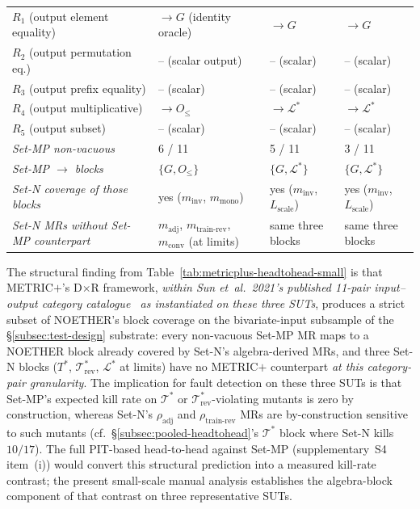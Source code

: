 \documentclass[acmsmall, screen]{acmart}
\begin{document}
\begin{table}[h]
\begin{tabular}{l l l l}
$R_1$ (output element equality)& $\to G$ (identity oracle) & $\to G$ & $\to G$ \\
$R_2$ (output permutation eq.) & -- (scalar output) & -- (scalar) & -- (scalar) \\
$R_3$ (output prefix equality) & -- (scalar) & -- (scalar) & -- (scalar) \\
$R_4$ (output multiplicative)  & $\to O_{\le}$ & $\to \mathcal{L}^{*}$ & $\to \mathcal{L}^{*}$ \\
$R_5$ (output subset)          & -- (scalar) & -- (scalar) & -- (scalar) \\
\midrule
\textit{Set-MP non-vacuous} & 6 / 11 & 5 / 11 & 3 / 11 \\
\textit{Set-MP $\to$ blocks} & $\{G, O_{\le}\}$ & $\{G, \mathcal{L}^{*}\}$ & $\{G, \mathcal{L}^{*}\}$ \\
\textit{Set-N coverage of those blocks} & yes ($m_{\mathrm{inv}}$, $m_{\mathrm{mono}}$) & yes ($m_{\mathrm{inv}}$, $L_{\mathrm{scale}}$) & yes ($m_{\mathrm{inv}}$, $L_{\mathrm{scale}}$) \\
\textit{Set-N MRs without Set-MP counterpart} & $m_{\mathrm{adj}}$, $m_{\mathrm{train\text{-}rev}}$, $m_{\mathrm{conv}}$ (at limits) & same three blocks & same three blocks \\
\bottomrule
\end{tabular}
\end{table}

The structural finding from Table~\ref{tab:metricplus-headtohead-small} is
that METRIC$+$'s D$\times$R framework, \emph{within Sun et~al.\ 2021's
published 11-pair input--output category catalogue~\cite{SunMETRICplus2021}
as instantiated on these three SUTs}, produces a strict subset of NOETHER's
block coverage on the bivariate-input subsample of the \S\ref{subsec:test-design}
substrate: every non-vacuous Set-MP MR maps to a NOETHER block already
covered by Set-N's algebra-derived MRs, and three Set-N blocks
($T^{*}$, $\mathcal{T}^{*}_{\mathrm{rev}}$, $\mathcal{L}^{*}$ at limits)
have no METRIC$+$ counterpart \emph{at this category-pair granularity}. The implication for fault detection on
these three SUTs is that Set-MP's expected kill rate on $\mathcal{T}^{*}$
or $\mathcal{T}^{*}_{\mathrm{rev}}$-violating mutants is zero by
construction, whereas Set-N's $\rho_{\mathrm{adj}}$ and
$\rho_{\mathrm{train\text{-}rev}}$ MRs are by-construction sensitive
to such mutants (cf.\ \S\ref{subsec:pooled-headtohead}'s
$\mathcal{T}^{*}$ block where Set-N kills $10/17$). The full PIT-based
head-to-head against Set-MP (supplementary~S4 item~(i))
would convert this structural prediction into a measured kill-rate
contrast; the present small-scale manual analysis establishes the
algebra-block component of that contrast on three representative SUTs.
\end{document}
